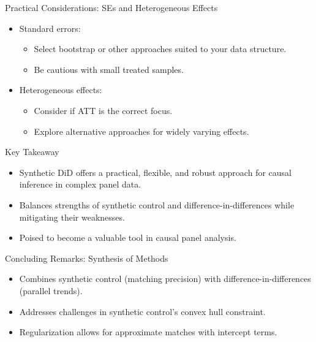 \documentclass{beamer}
\begin{document}
\begin{frame}{Practical Considerations: SEs and Heterogeneous Effects}

\begin{itemize}
    \item Standard errors:
    \begin{itemize}
        \item Select bootstrap or other approaches suited to your data structure.
        \item Be cautious with small treated samples.
    \end{itemize}
    \item Heterogeneous effects:
    \begin{itemize}
        \item Consider if ATT is the correct focus.
        \item Explore alternative approaches for widely varying effects.
    \end{itemize}
\end{itemize}

\end{frame}







\begin{frame}{Key Takeaway}

\begin{itemize}
    \item Synthetic DiD offers a practical, flexible, and robust approach for causal inference in complex panel data.
    \item Balances strengths of synthetic control and difference-in-differences while mitigating their weaknesses.
    \item Poised to become a valuable tool in causal panel analysis.
\end{itemize}

\end{frame}


\begin{frame}{Concluding Remarks: Synthesis of Methods}

\begin{itemize}
    \item Combines synthetic control (matching precision) with difference-in-differences (parallel trends).
    \item Addresses challenges in synthetic control’s convex hull constraint.
    \item Regularization allows for approximate matches with intercept terms.
\end{itemize}

\end{frame}
\end{document}

